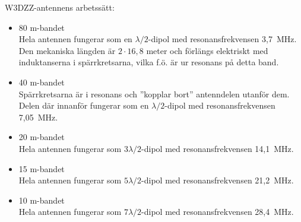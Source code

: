 W3DZZ-antennens arbetssätt:
\begin{itemize}
\item 80 m-bandet \\ Hela antennen fungerar som en \(\lambda/2\)-dipol med
  resonansfrekvensen 3,7~MHz.
  Den mekaniska längden är \(2 \cdot 16,8\) meter och förlängs elektriskt med
  induktanserna i spärrkretsarna, vilka f.ö. är ur resonans på detta band.

\item 40 m-bandet \\ Spärrkretsarna är i resonans och ''kopplar bort''
  antenndelen utanför dem.
  Delen där innanför fungerar som en \(\lambda/2\)-dipol med resonansfrekvensen
  7,05~MHz.

\item 20 m-bandet \\ Hela antennen fungerar som \(3\lambda/2\)-dipol
  med resonansfrekvensen 14,1~MHz.

\item 15 m-bandet \\ Hela antennen fungerar som \(5\lambda/2\)-dipol
  med resonansfrekvensen 21,2~MHz.

\item 10 m-bandet \\ Hela antennen fungerar som \(7\lambda/2\)-dipol
  med resonansfrekvensen 28,4~MHz.
\end{itemize}
